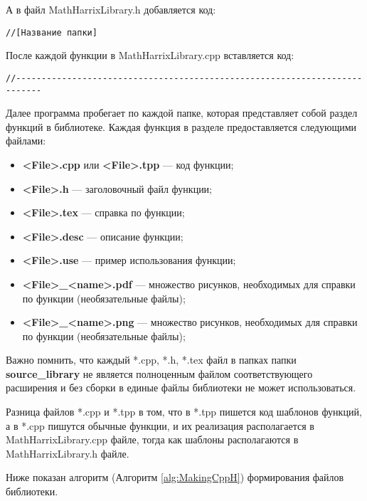 \documentclass[a4paper,12pt]{article}
\begin{document}
А в файл MathHarrixLibrary.h добавляется код:

\begin{lstlisting}[label=make_sectionh,caption=Название раздела]
//[Название папки]
\end{lstlisting}

После каждой функции в MathHarrixLibrary.cpp вставляется код:
\begin{lstlisting}[label=make_sectionh,caption=Название раздела]
//---------------------------------------------------------------------------
\end{lstlisting}

Далее программа пробегает по каждой папке, которая представляет собой раздел функций в библиотеке. Каждая функция в разделе предоставляется следующими файлами:
\begin{itemize}
\item \textbf{<File>.cpp} или \textbf{<File>.tpp} --- код функции;
\item \textbf{<File>.h} --- заголовочный файл функции;
\item \textbf{<File>.tex} --- справка по функции;
\item \textbf{<File>.desc} --- описание функции;
\item \textbf{<File>.use} --- пример использования функции;
\item \textbf{<File>\_<name>.pdf} --- множество рисунков, необходимых для справки по функции (необязательные файлы);
\item \textbf{<File>\_<name>.png} --- множество рисунков, необходимых для справки по функции (необязательные файлы);
\end{itemize}

Важно помнить, что каждый *.cpp, *.h, *.tex файл в папках папки \textbf{source\_library} не является полноценным файлом соответствующего расширения и без сборки в единые файлы библиотеки не может использоваться.

Разница файлов *.cpp и *.tpp в том, что в *.tpp  пишется код шаблонов функций, а в *.cpp пишутся обычные функции, и их реализация располагается в MathHarrixLibrary.cpp файле, тогда как шаблоны располагаются в MathHarrixLibrary.h файле.

Ниже показан алгоритм (Алгоритм \ref{alg:MakingCppH}) формирования файлов библиотеки.
\end{document}

